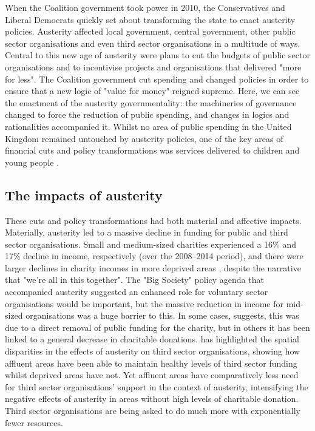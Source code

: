 When the Coalition government took power in 2010, the Conservatives and Liberal Democrats quickly set about transforming the state to enact austerity policies. Austerity affected local government, central government, other public sector organisations and even third sector organisations in a multitude of ways. Central to this new age of austerity were plans to cut the budgets of public sector organisations and to incentivise projects and organisations that delivered "more for less". The Coalition government cut spending and changed policies in order to ensure that a new logic of "value for money" reigned supreme.  Here, we can see the enactment of the austerity governmentality: the machineries of governance changed to force the reduction of public spending, and changes in logics and rationalities accompanied it. Whilst no area of public spending in the United Kingdom remained untouched by austerity policies, one of the key areas of financial cuts and policy transformations was services delivered to children and young people \citep{youdell_assembling_2015}.

\subsection{The impacts of austerity}
\label{subsec:the-impacts-of-austerity}

These cuts and policy transformations had both material and affective impacts. Materially, austerity led to a massive decline in funding for public and third sector organisations. Small and medium-sized charities experienced a 16\% and 17\% decline in income, respectively (over the 2008–2014 period), and there were larger declines in charity incomes in more deprived areas \citep{clifford_charitable_2017}, despite the narrative that "we're all in this together". The "Big Society" policy agenda that accompanied austerity suggested an enhanced role for voluntary sector organisations would be important, but the massive reduction in income for mid-sized organisations was a huge barrier to this. In some cases, \citet{clifford_charitable_2017} suggests, this was due to a direct removal of public funding for the charity, but in others it has been linked to a general decrease in charitable donations. \citet{jones_uneven_2016} has highlighted the spatial disparities in the effects of austerity on third sector organisations, showing how affluent areas have been able to maintain healthy levels of third sector funding whilst deprived areas have not. Yet affluent areas have comparatively less need for third sector organisations' support in the context of austerity, intensifying the negative effects of austerity in areas without high levels of charitable donation. Third sector organisations are being asked to do much more with exponentially fewer resources.

